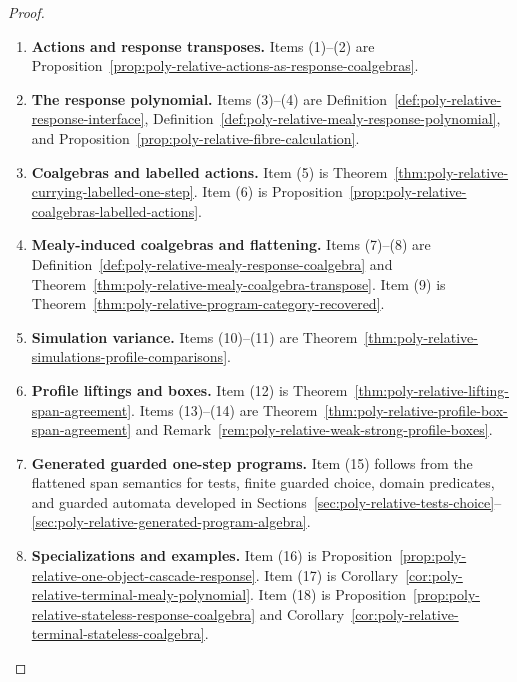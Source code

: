 \begin{proof}
\leavevmode
\begin{enumerate}
\item \textbf{Actions and response transposes.}
Items (1)--(2) are
Proposition~\ref{prop:poly-relative-actions-as-response-coalgebras}.

\item \textbf{The response polynomial.}
Items (3)--(4) are Definition~\ref{def:poly-relative-response-interface},
Definition~\ref{def:poly-relative-mealy-response-polynomial}, and
Proposition~\ref{prop:poly-relative-fibre-calculation}.

\item \textbf{Coalgebras and labelled actions.}
Item (5) is
Theorem~\ref{thm:poly-relative-currying-labelled-one-step}.  Item (6) is
Proposition~\ref{prop:poly-relative-coalgebras-labelled-actions}.

\item \textbf{Mealy-induced coalgebras and flattening.}
Items (7)--(8) are Definition~\ref{def:poly-relative-mealy-response-coalgebra}
and Theorem~\ref{thm:poly-relative-mealy-coalgebra-transpose}.  Item (9) is
Theorem~\ref{thm:poly-relative-program-category-recovered}.

\item \textbf{Simulation variance.}
Items (10)--(11) are
Theorem~\ref{thm:poly-relative-simulations-profile-comparisons}.

\item \textbf{Profile liftings and boxes.}
Item (12) is
Theorem~\ref{thm:poly-relative-lifting-span-agreement}.  Items (13)--(14) are
Theorem~\ref{thm:poly-relative-profile-box-span-agreement} and
Remark~\ref{rem:poly-relative-weak-strong-profile-boxes}.

\item \textbf{Generated guarded one-step programs.}
Item (15) follows from the flattened span semantics for tests, finite guarded
choice, domain predicates, and guarded automata developed in
Sections~\ref{sec:poly-relative-tests-choice}--\ref{sec:poly-relative-generated-program-algebra}.

\item \textbf{Specializations and examples.}
Item (16) is Proposition~\ref{prop:poly-relative-one-object-cascade-response}.
Item (17) is Corollary~\ref{cor:poly-relative-terminal-mealy-polynomial}.
Item (18) is Proposition~\ref{prop:poly-relative-stateless-response-coalgebra}
and Corollary~\ref{cor:poly-relative-terminal-stateless-coalgebra}.
\end{enumerate}
\end{proof}

